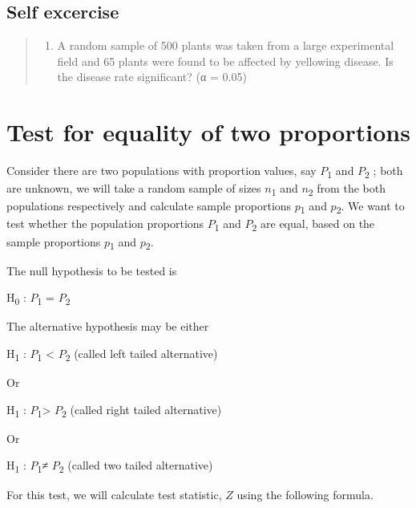 \documentclass[
]{book}
\providecommand{\tightlist}{%
  \setlength{\itemsep}{0pt}\setlength{\parskip}{0pt}}
\begin{document}
\hypertarget{self-excercise}{%
\subsection*{Self excercise}\label{self-excercise}}

\begin{quote}
\begin{enumerate}
\def\labelenumi{\arabic{enumi}.}
\tightlist
\item
  A random sample of 500 plants was taken from a large experimental field and 65 plants were found to be affected by yellowing disease. Is the disease rate significant? (α = 0.05)
\end{enumerate}
\end{quote}

\hypertarget{test-for-equality-of-two-proportions}{%
\section{Test for equality of two proportions}\label{test-for-equality-of-two-proportions}}

Consider there are two populations with proportion values, say \(P\)\textsubscript{1} and \(P\)\textsubscript{2} ; both are unknown, we will take a random sample of sizes \(n\)\textsubscript{1} and \(n\)\textsubscript{2} from the both populations respectively and calculate sample proportions \(p\)\textsubscript{1} and \(p\)\textsubscript{2}. We want to test whether the population proportions \(P\)\textsubscript{1} and \(P\)\textsubscript{2} are equal, based on the sample
proportions \(p\)\textsubscript{1} and \(p\)\textsubscript{2}.

The null hypothesis to be tested is

H\textsubscript{0} : \(P\)\textsubscript{1} = \(P\)\textsubscript{2}

The alternative hypothesis may be either

H\textsubscript{1} : \(P\)\textsubscript{1} \textless{} \(P\)\textsubscript{2} (called left tailed alternative)

Or

H\textsubscript{1} : \(P\)\textsubscript{1}\textgreater{} \(P\)\textsubscript{2} (called right tailed alternative)

Or

H\textsubscript{1} : \(P\)\textsubscript{1}≠ \(P\)\textsubscript{2} (called two tailed alternative)

For this test, we will calculate test statistic, \(Z\) using the following formula.
\end{document}
